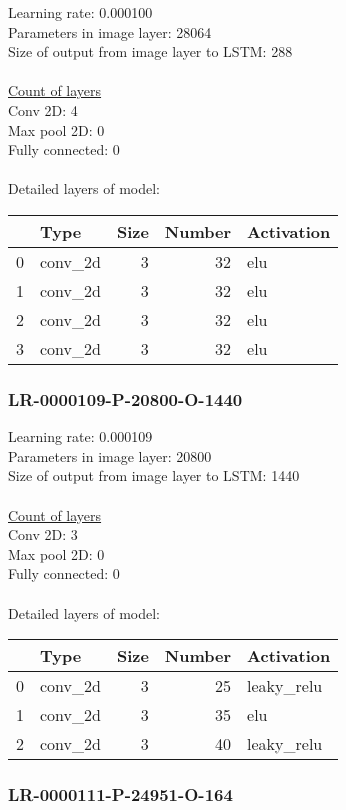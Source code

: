 Learning rate: 0.000100
\\Parameters in image layer: 28064
\\Size of output from image layer to LSTM: 288
\\\\\underline{Count of layers} 
\\Conv 2D:           4\\Max pool 2D:      0\\Fully connected:  0
\\\\Detailed layers of model: \\\begin{tabular}{rlrrl}
\hline
    & Type    &   Size &   Number & Activation   \\
\hline
  0 & conv\_2d &      3 &       32 & elu          \\
  1 & conv\_2d &      3 &       32 & elu          \\
  2 & conv\_2d &      3 &       32 & elu          \\
  3 & conv\_2d &      3 &       32 & elu          \\
\hline
\end{tabular}\subsubsection*{LR-0000109-P-20800-O-1440}
Learning rate: 0.000109
\\Parameters in image layer: 20800
\\Size of output from image layer to LSTM: 1440
\\\\\underline{Count of layers} 
\\Conv 2D:           3\\Max pool 2D:      0\\Fully connected:  0
\\\\Detailed layers of model: \\\begin{tabular}{rlrrl}
\hline
    & Type    &   Size &   Number & Activation   \\
\hline
  0 & conv\_2d &      3 &       25 & leaky\_relu   \\
  1 & conv\_2d &      3 &       35 & elu          \\
  2 & conv\_2d &      3 &       40 & leaky\_relu   \\
\hline
\end{tabular}\subsubsection*{LR-0000111-P-24951-O-164}
